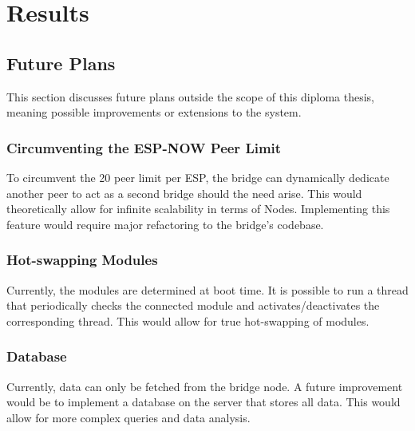 \renewcommand*\chapterpagestyle{scrheadings}
\chapter{Results} 

\section{Future Plans}
This section discusses future plans outside the scope of this diploma thesis,
meaning possible improvements or extensions to the system.

    \subsection{Circumventing the ESP-NOW Peer Limit}
    To circumvent the 20 peer limit per ESP, the bridge can dynamically
    dedicate another peer to act as a second bridge should the
    need arise. This would theoretically allow for infinite scalability in terms
    of Nodes. Implementing this feature would require major refactoring to the
    bridge's codebase.

    \subsection{Hot-swapping Modules}
    Currently, the modules are determined at boot time. It is possible to run
    a thread that periodically checks the connected module and activates/deactivates 
    the corresponding thread. This would allow for true hot-swapping of modules.

    \subsection{Database}
    Currently, data can only be fetched from the bridge node.
    A future improvement would be to implement a database on the
    server that stores all data. This would allow for more 
    complex queries and data analysis.

